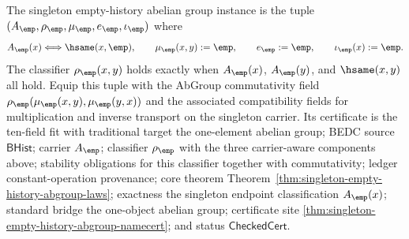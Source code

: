 \begin{definition}
\label{def:singleton-empty-history-abgroup-instance}
The singleton empty-history abelian group instance is the tuple
$(A_{\emp},\rho_{\emp},\mu_{\emp},e_{\emp},\iota_{\emp})$ where
$$
A_{\emp}(x)\Longleftrightarrow\hsame(x,\emp),\qquad
\mu_{\emp}(x,y):=\emp,\qquad
e_{\emp}:=\emp,\qquad
\iota_{\emp}(x):=\emp.
$$
The classifier $\rho_{\emp}(x,y)$ holds exactly when $A_{\emp}(x)$,
$A_{\emp}(y)$, and $\hsame(x,y)$ all hold.
Equip this tuple with the AbGroup commutativity field
$\rho_{\emp}(\mu_{\emp}(x,y),\mu_{\emp}(y,x))$ and the associated
compatibility fields for multiplication and inverse transport on the singleton
carrier.
Its certificate is the ten-field fit with traditional target the one-element
abelian group; BEDC source $\mathsf{BHist}$; carrier $A_{\emp}$; classifier
$\rho_{\emp}$ with the three carrier-aware components above; stability
obligations for this classifier together with commutativity; ledger
constant-operation provenance; core theorem
Theorem~\ref{thm:singleton-empty-history-abgroup-laws}; exactness the singleton
endpoint classification $A_{\emp}(x)$; standard bridge the one-object abelian
group; certificate site \autoref{thm:singleton-empty-history-abgroup-namecert};
and status $\mathsf{CheckedCert}$.
\end{definition}

